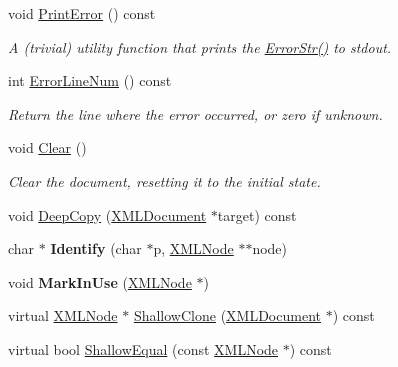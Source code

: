 \begin{DoxyCompactItemize}
\item 
\mbox{\label{classtinyxml2_1_1_x_m_l_document_a1d033945b42e125d933d6231e4571552}} 
void \mbox{\hyperlink{classtinyxml2_1_1_x_m_l_document_a1d033945b42e125d933d6231e4571552}{Print\+Error}} () const
\begin{DoxyCompactList}\small\item\em A (trivial) utility function that prints the \mbox{\hyperlink{classtinyxml2_1_1_x_m_l_document_ae97fff2402a0d01e0509c430b37996b3}{Error\+Str()}} to stdout. \end{DoxyCompactList}\item 
\mbox{\label{classtinyxml2_1_1_x_m_l_document_a57400f816dbe7799ece33615ead9ab76}} 
int \mbox{\hyperlink{classtinyxml2_1_1_x_m_l_document_a57400f816dbe7799ece33615ead9ab76}{Error\+Line\+Num}} () const
\begin{DoxyCompactList}\small\item\em Return the line where the error occurred, or zero if unknown. \end{DoxyCompactList}\item 
\mbox{\label{classtinyxml2_1_1_x_m_l_document_a65656b0b2cbc822708eb351504178aaf}} 
void \mbox{\hyperlink{classtinyxml2_1_1_x_m_l_document_a65656b0b2cbc822708eb351504178aaf}{Clear}} ()
\begin{DoxyCompactList}\small\item\em Clear the document, resetting it to the initial state. \end{DoxyCompactList}\item 
void \mbox{\hyperlink{classtinyxml2_1_1_x_m_l_document_af592ffc91514e25a39664521ac83db45}{Deep\+Copy}} (\mbox{\hyperlink{classtinyxml2_1_1_x_m_l_document}{X\+M\+L\+Document}} $\ast$target) const
\item 
\mbox{\label{classtinyxml2_1_1_x_m_l_document_a25827d1bec509ad566a107e5853ed040}} 
char $\ast$ {\bfseries Identify} (char $\ast$p, \mbox{\hyperlink{classtinyxml2_1_1_x_m_l_node}{X\+M\+L\+Node}} $\ast$$\ast$node)
\item 
\mbox{\label{classtinyxml2_1_1_x_m_l_document_a95d28ecb4760a994556b0a51690b21be}} 
void {\bfseries Mark\+In\+Use} (\mbox{\hyperlink{classtinyxml2_1_1_x_m_l_node}{X\+M\+L\+Node}} $\ast$)
\item 
virtual \mbox{\hyperlink{classtinyxml2_1_1_x_m_l_node}{X\+M\+L\+Node}} $\ast$ \mbox{\hyperlink{classtinyxml2_1_1_x_m_l_document_aa37cc1709d7e1e988bc17dcfb24a69b8}{Shallow\+Clone}} (\mbox{\hyperlink{classtinyxml2_1_1_x_m_l_document}{X\+M\+L\+Document}} $\ast$) const
\item 
virtual bool \mbox{\hyperlink{classtinyxml2_1_1_x_m_l_document_a6fe5ef18699091844fcf64b56ffa5bf9}{Shallow\+Equal}} (const \mbox{\hyperlink{classtinyxml2_1_1_x_m_l_node}{X\+M\+L\+Node}} $\ast$) const
\end{DoxyCompactItemize}
